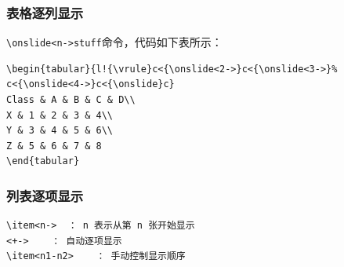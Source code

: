 \subsubsection{表格逐列显示}


\verb|\onslide<n->stuff|命令，代码如下表所示：
\begin{shaded}
\begin{Verbatim}
\begin{tabular}{l!{\vrule}c<{\onslide<2->}c<{\onslide<3->}%
c<{\onslide<4->}c<{\onslide}c}
Class & A & B & C & D\\
X & 1 & 2 & 3 & 4\\
Y & 3 & 4 & 5 & 6\\
Z & 5 & 6 & 7 & 8
\end{tabular}
\end{Verbatim}
\end{shaded}
\subsubsection{列表逐项显示}


\begin{shaded}
\begin{Verbatim}
\item<n->  ： n 表示从第 n 张开始显示
<+->    ： 自动逐项显示
\item<n1-n2>    ： 手动控制显示顺序
\end{Verbatim}
\end{shaded}

